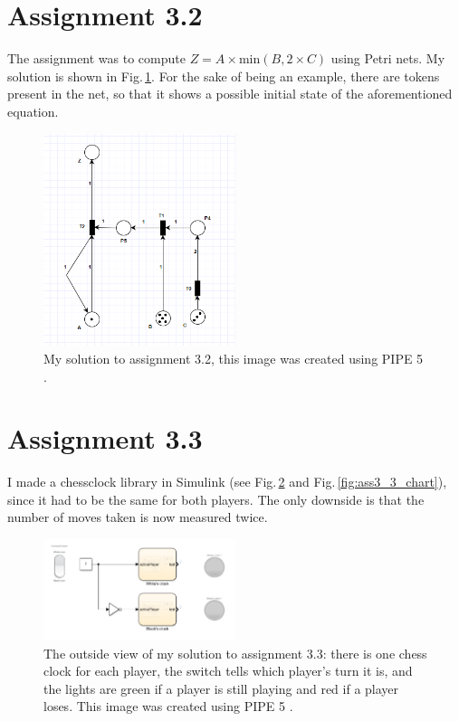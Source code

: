 \documentclass{article}
\begin{document}
	\section{Assignment 3.2}
	\par The assignment was to compute $Z = A \times \textrm{min}(B, 2\times C)$ using Petri nets. My solution is shown in Fig.\,\ref{fig:ass3_2}. For the sake of being an example, there are tokens present in the net, so that it shows a possible initial state of the aforementioned equation.
	
	\begin{figure}
		\includegraphics[width=0.5\textwidth]{Ass3_2}
		\caption{My solution to assignment 3.2, this image was created using PIPE 5 \cite{dingle2009pipe2, bonet2007pipe}. \label{fig:ass3_2}}
	\end{figure}
	
	\section{Assignment 3.3}
	\par I made a chessclock library in Simulink (see Fig.\,\ref{fig:ass3_3_env} and Fig.\,\ref{fig:ass3_3_chart}), since it had to be the same for both players. The only downside is that the number of moves taken is now measured twice.
	
	
	\begin{figure}
		\includegraphics[width=0.5\textwidth]{Ass3_3_environment}
		\caption{The outside view of my solution to assignment 3.3: there is one chess clock for each player, the switch tells which player's turn it is, and the lights are green if a player is still playing and red if a player loses.
		This image was created using PIPE 5 \cite{dingle2009pipe2, bonet2007pipe}. \label{fig:ass3_3_env}}
	\end{figure}
\end{document}
